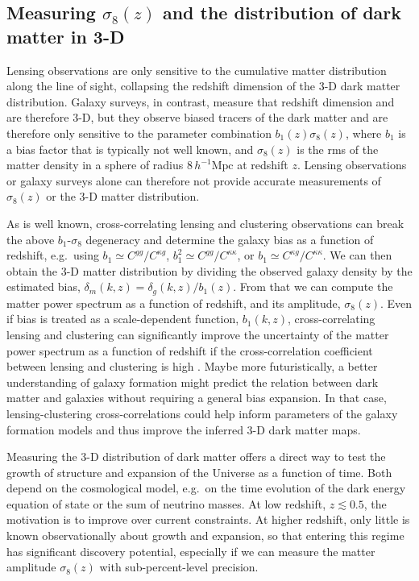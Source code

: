 \documentclass[prd,superscriptaddress,floatfix,notitlepage,nofootinbib,reprint]{revtex4-1} %
\begin{document}
\subsection{Measuring \texorpdfstring{$\sigma_8(z)$}{sigma8(z)} and the distribution of dark matter in 3-D}
\label{se:S8Motivation}

Lensing observations are only sensitive to the cumulative matter distribution along the line of sight, collapsing the redshift dimension of the 3-D dark matter distribution.
Galaxy surveys, in contrast, measure that redshift dimension and are therefore 3-D, but they observe biased tracers of the dark matter and are therefore only sensitive to the parameter combination $b_1(z)\sigma_8(z)$, where $b_1$ is a bias factor that is typically not well known, and $\sigma_8(z)$ is the rms of the matter density in a sphere of radius $8\,h^{-1}\mathrm{Mpc}$ at redshift $z$.
Lensing observations or galaxy surveys alone can therefore not provide accurate measurements of $\sigma_8(z)$ or the 3-D matter distribution.

As is well known, cross-correlating lensing and clustering observations can break the above $b_1$-$\sigma_8$ degeneracy and determine the galaxy bias as a function of redshift, e.g.~using $b_1\simeq C^{gg}/C^{\kappa g}$, $b_1^2\simeq C^{gg}/C^{\kappa\kappa}$, or $b_1\simeq C^{\kappa g}/C^{\kappa\kappa}$.
We can then obtain the 3-D matter distribution by dividing the observed galaxy density by the estimated bias, $\delta_m(k,z)=\delta_g(k,z)/b_1(z)$.
From that we can compute the matter power spectrum as a function of redshift, and its amplitude, $\sigma_8(z)$.
Even if bias is treated as a scale-dependent function, $b_1(k,z)$, cross-correlating lensing and clustering can significantly improve the uncertainty of the matter power spectrum as a function of redshift if the cross-correlation coefficient between lensing and clustering is high \cite{Pen0402008}.
Maybe more futuristically, a better understanding of galaxy formation might predict the relation between dark matter and galaxies without requiring a general bias expansion.
In that case, lensing-clustering cross-correlations could help inform parameters of the galaxy formation models and thus improve the inferred 3-D dark matter maps.


Measuring the 3-D distribution of dark matter offers a direct way to test the growth of structure and expansion of the Universe as a function of time.
Both depend on the cosmological model, e.g.~on the time evolution of the dark energy equation of state or the sum of neutrino masses.
At low redshift,  $z\lesssim 0.5$, the motivation is to improve over current constraints.
At higher redshift, only little is known observationally about growth and expansion, so that entering this regime has significant discovery potential, especially if we can measure the matter amplitude $\sigma_8(z)$ with sub-percent-level precision.
\end{document}
